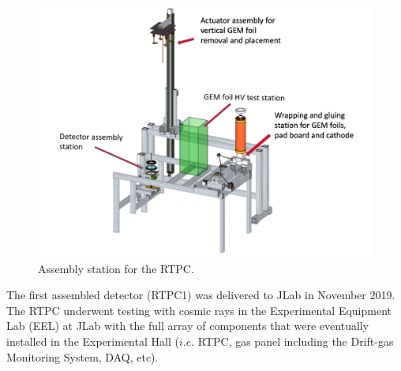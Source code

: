 \begin{figure}[h!]
	\centering
	\includegraphics[width=0.8\linewidth]{figures/rtpc_assembly.png}
	\caption{Assembly station for the RTPC.}
	\label{fig:rtpc_assembly}
\end{figure}

The first assembled detector (RTPC1) was delivered to JLab in November 2019. The RTPC underwent testing with cosmic rays in the Experimental Equipment Lab (EEL) at JLab with the full array of components that were eventually installed in the Experimental Hall ($i.e.$ RTPC, gas panel including the Drift-gas Monitoring System, DAQ, etc). 

